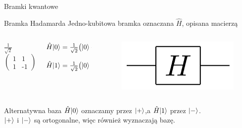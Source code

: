 \documentclass{beamer}
\DeclarePairedDelimiter\ket{\lvert}{\rangle}
\begin{document}
	\begin{frame}{Bramki kwantowe}
		\begin{block}{Bramka Hadamarda}
			\vspace{0.5em}
			Jedno-kubitowa bramka oznaczana $\hat{H}$, opisana macierzą\\
				
			\begin{columns}
				\begin{column}{0.33\textwidth}
					\begin{center}
						$\frac{1}{\sqrt{2}}$
						$\begin{pmatrix}
						1 & 1\\
						1 &\mbox{-}1 
						\end{pmatrix}$	
					\end{center}	
				\end{column}
				
				\begin{column}{0.33\textwidth}
					\begin{center}
					\raggedright$\hat{H}\ket{0} = \frac{1}{\sqrt{2}}\big(\ket{0} + \ket{1}\big)$\\
					\raggedright$\hat{H}\ket{1} = \frac{1}{\sqrt{2}}\big(\ket{0} - \ket{1}\big)$\\		
					\end{center}	
				\end{column}
				\begin{column}{0.33\textwidth}
					\begin{center}
						\begin{figure}
							\includegraphics[scale=0.224]{media/bramkaHadamarda.png}
						\end{figure}
					\end{center}
				\end{column}
			\end{columns}					
			\vspace{0.5em}
		\end{block}
	
		\begin{block}{Alternatywna baza}
			\vspace{0.5em}
			$\hat{H}\ket{0}$ oznaczamy przez $\ket{+}$,a $\hat{H}\ket{1}$ przez $\ket{-}$.\\
			$\ket{+}$ i $\ket{-}$ są ortogonalne, więc również wyznaczają bazę.
			\vspace{0.5em}
		\end{block}
	
	\end{frame}
	
\end{document}
